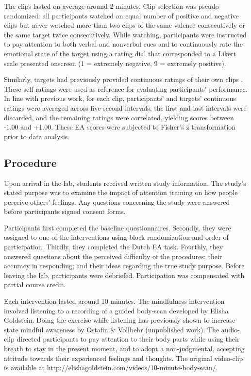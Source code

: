 \documentclass[authordate, empirical, issue]{jote-new-article}
\begin{document}
The clips lasted on average around 2 minutes. Clip selection was pseudo-randomized: all participants watched an equal number of positive and negative clips but never watched more than two clips of the same valence consecutively or the same target twice consecutively. While watching, participants were instructed to pay attention to both verbal and nonverbal cues and to continuously rate the emotional state of the target using a rating dial that corresponded to a Likert scale presented onscreen (1 = extremely negative, 9 = extremely positive).



Similarly, targets had previously provided continuous ratings of their own clips \parencites{aanhetRot2014}. These self-ratings were used as reference for evaluating participants' performance. In line with previous work, for each clip, participants' and targets' continuous ratings were averaged across five-second intervals, the first and last intervals were discarded, and the remaining ratings were correlated, yielding scores between -1.00 and +1.00. These EA scores were subjected to Fisher's z transformation prior to data analysis.



\subsection{Procedure}



Upon arrival in the lab, students received written study information. The study's stated purpose was to examine the impact of attention training on how people perceive others' feelings. Any questions concerning the study were answered before participants signed consent forms.



Participants first completed the baseline questionnaires. Secondly, they were assigned to one of the interventions using block randomization and order of participation. Thirdly, they completed the Dutch EA task. Fourthly, they answered questions about the perceived difficulty of the procedures; their accuracy in responding; and their ideas regarding the true study purpose. Before leaving the lab, participants were debriefed. Participation was compensated with partial course credit.



Each intervention lasted around 10 minutes.\textbf{ }The mindfulness intervention involved listening\textbf{ }to a recording of a guided body-scan developed by Elisha Goldstein. Doing the exercise while listening has previously shown to increase state mindful awareness by Ostafin \& Vollbehr (unpublished work). The audio-clip directed participants to pay attention to their body parts while using their breath to stay in the present moment, and to adopt a non-judgmental, accepting attitude towards their experienced feelings and thoughts. The original video-clip is available at http://elishagoldstein.com/videos/10-minute-body-scan/.
\end{document}

